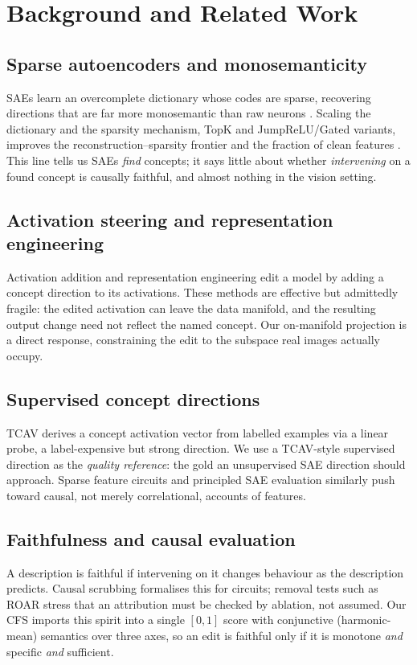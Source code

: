 \documentclass[conference]{IEEEtran}
\begin{document}
\section{Background and Related Work}

\subsection{Sparse autoencoders and monosemanticity}
SAEs learn an overcomplete dictionary whose codes are sparse, recovering directions that are far more monosemantic than raw neurons \cite{cunningham2023sae,bricken2023monosemanticity}. Scaling the dictionary and the sparsity mechanism, TopK and JumpReLU/Gated variants, improves the reconstruction--sparsity frontier and the fraction of clean features \cite{gao2024topk,rajamanoharan2024jumprelu,templeton2024scaling}. This line tells us SAEs \emph{find} concepts; it says little about whether \emph{intervening} on a found concept is causally faithful, and almost nothing in the vision setting.

\subsection{Activation steering and representation engineering}
Activation addition \cite{turner2023actadd} and representation engineering \cite{zou2023repe} edit a model by adding a concept direction to its activations. These methods are effective but admittedly fragile: the edited activation can leave the data manifold, and the resulting output change need not reflect the named concept. Our on-manifold projection is a direct response, constraining the edit to the subspace real images actually occupy.

\subsection{Supervised concept directions}
TCAV \cite{kim2017tcav} derives a concept activation vector from labelled examples via a linear probe, a label-expensive but strong direction. We use a TCAV-style supervised direction as the \emph{quality reference}: the gold an unsupervised SAE direction should approach. Sparse feature circuits \cite{marks2024circuits} and principled SAE evaluation \cite{makelov2024principled} similarly push toward causal, not merely correlational, accounts of features.

\subsection{Faithfulness and causal evaluation}
A description is faithful if intervening on it changes behaviour as the description predicts. Causal scrubbing \cite{chan2022scrubbing} formalises this for circuits; removal tests such as ROAR \cite{hooker2018roar} stress that an attribution must be checked by ablation, not assumed. Our CFS imports this spirit into a single $[0,1]$ score with conjunctive (harmonic-mean) semantics over three axes, so an edit is faithful only if it is monotone \emph{and} specific \emph{and} sufficient.
\end{document}
